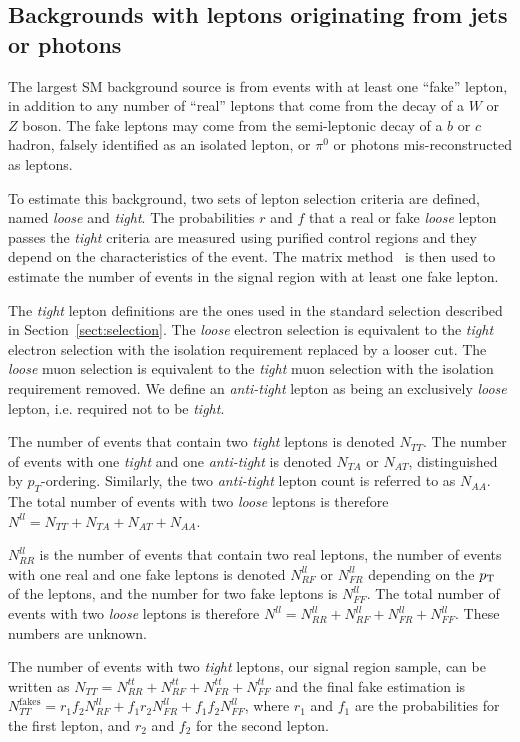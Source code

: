 \subsection{Backgrounds with leptons originating from jets or photons}\label{sect:fakes}
The largest SM background source is from events with at least one ``fake'' lepton,
in addition to any number of ``real'' leptons that come from the decay of a $W$ or $Z$ boson.
The fake leptons may come from the semi-leptonic decay of a $b$ or $c$ hadron,
falsely identified as an isolated lepton, or $\pi^0$ or photons mis-reconstructed as leptons.

To estimate this background, two sets of lepton selection criteria are defined, named 
{\it loose} and {\it tight}. The probabilities $r$ and $f$ that a real or fake {\it loose} lepton 
passes the {\it tight} criteria are measured using purified control regions and they depend on the
characteristics of the event.
The matrix method~\cite{Aad:2010ey,Theveneaux-Pelzer:1476909} is then used to estimate the number 
of events in the signal region with at least one fake lepton.

The {\it tight} lepton definitions are the ones used in the standard selection described in
Section~\ref{sect:selection}. 
The {\it loose} electron selection is equivalent to the {\it tight} 
electron selection with the isolation requirement replaced by a looser cut. The {\it loose} muon selection
is equivalent to the {\it tight} muon selection with the isolation requirement removed. We define an
{\it anti-tight} lepton as being an exclusively {\it loose} lepton, i.e. required not to be {\it tight}.


The number of events that contain
two {\it tight} leptons is denoted $N_{TT}$. The number of events with one {\it tight} and one 
{\it anti-tight} is denoted $N_{TA}$ or $N_{AT}$, distinguished by $p_T$-ordering.
Similarly, the two {\it anti-tight} lepton count is referred to as $N_{AA}$. The total number of
events with two {\it loose} leptons is therefore $N^{ll}=N_{TT}+N_{TA}+N_{AT}+N_{AA}$.

$N_{RR}^{ll}$ is the number of events that contain two real leptons, the number of events with one 
real and one fake leptons is denoted $N_{RF}^{ll}$ or $N_{FR}^{ll}$ depending on the $p_{\mathrm{T}}$ of the 
leptons, and the number for two fake leptons is $N_{FF}^{ll}$. The total number of events with
two {\it loose} leptons is therefore
$N^{ll}=N_{RR}^{ll}+N_{RF}^{ll}+N_{FR}^{ll}+N_{FF}^{ll}$.
These numbers are unknown.

The number of events with two {\it tight} leptons, our signal region sample, can be written as
$N_{TT}=N_{RR}^{tt}+N_{RF}^{tt}+N_{FR}^{tt}+N_{FF}^{tt}$ and the final fake estimation is
$N_{TT}^{\mathrm{fakes}}=r_1 f_2 N_{RF}^{ll}+f_1 r_2 N_{FR}^{ll}+f_1 f_2 N_{FF}^{ll}$, where $r_1$ and $f_1$
are the probabilities for the first lepton, and $r_2$ and $f_2$ for the second lepton.

